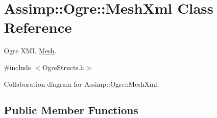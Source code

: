 \hypertarget{class_assimp_1_1_ogre_1_1_mesh_xml}{\section{Assimp\+:\+:Ogre\+:\+:Mesh\+Xml Class Reference}
\label{class_assimp_1_1_ogre_1_1_mesh_xml}
}


Ogre X\+M\+L \hyperlink{class_assimp_1_1_ogre_1_1_mesh}{Mesh}.  




{\ttfamily \#include $<$Ogre\+Structs.\+h$>$}



Collaboration diagram for Assimp\+:\+:Ogre\+:\+:Mesh\+Xml\+:
\subsection*{Public Member Functions}
